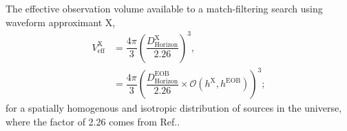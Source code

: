 \documentclass[aps,
prd,
amsmath,
amssymb,
twocolumn,
floatfix,
groupedaddress]{revtex4-1}
\newcommand{\D}{\mathrm{d}}
\newcommand{\eff}{\mathrm{eff}}
\newcommand{\EOB}{\mathrm{EOB}}
\newcommand{\Olap}{\mathcal{O}}
\newcommand{\X}{\mathrm{X}}
\newcommand{\horizon}{\mathrm{Horizon}}
\newcommand{\opt}{\mathrm{opt}}
\newcommand{\iso}{\mathrm{iso}}
\def\l({\left(}
\def\r){\right)}
\begin{document}
The effective observation volume available to a match-filtering search using waveform approximant $\X$,
\begin{equation}
\begin{split}
V^{\X}_{\eff} &= \dfrac{4\pi}{3} \l(\dfrac{D^{\X}_{\horizon}}{2.26}\r)^3,\\
					&= \dfrac{4\pi}{3} \l(\dfrac{D^{\EOB}_{\horizon}}{2.26}\times\Olap(h^{\X},h^{\EOB})\r)^3;
\end{split}
\end{equation}
for a spatially homogenous and isotropic distribution of sources in the universe, where the factor of 2.26 comes from Ref.\citep{FinnChernoffDA}.
\end{document}
